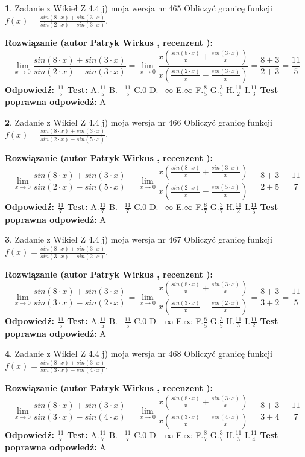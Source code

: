 \documentclass[12pt, a4paper]{article}
\theoremstyle{definition} %
\newtheorem{zad}{}
\newcommand{\zadStart}[1]{\begin{zad}#1\newline}
\newcommand{\zadStop}{\end{zad}}
\newcommand{\rozwStart}[2]{\noindent \textbf{Rozwiązanie (autor #1 , recenzent #2): }\newline}
\newcommand{\rozwStop}{\newline}
\newcommand{\odpStart}{\noindent \textbf{Odpowiedź:}\newline}
\newcommand{\odpStop}{\newline}
\newcommand{\testStart}{\noindent \textbf{Test:}\newline}
\newcommand{\testStop}{\newline}
\newcommand{\kluczStart}{\noindent \textbf{Test poprawna odpowiedź:}\newline}
\newcommand{\kluczStop}{\newline}
\begin{document}
\zadStart{Zadanie z Wikieł Z 4.4 j) moja wersja nr 465}
Obliczyć granicę funkcji $f(x)=\frac{sin(8\cdot x) +sin(3\cdot x)}{sin(2\cdot x) -sin(3\cdot x)}$.
\zadStop
\rozwStart{Patryk Wirkus}{}
$$\lim\limits_{x\to 0}\frac{sin(8\cdot x) +sin(3\cdot x)}{sin(2\cdot x) -sin(3\cdot x)}=\lim\limits_{x\to 0}\frac{x(\frac{sin(8\cdot x)}{x}+\frac{sin(3\cdot x)}{x})}{x(\frac{sin(2\cdot x)}{x}-\frac{sin(3\cdot x)}{x})}=\frac{8+3}{2+3} = \frac{11}{5}$$
\rozwStop
\odpStart
$\frac{11}{5}$
\odpStop
\testStart
A.$\frac{11}{5}$
B.$-\frac{11}{5}$
C.$0$
D.$-\infty$
E.$\infty$
F.$\frac{8}{5}$
G.$\frac{3}{5}$
H.$\frac{11}{2}$
I.$\frac{11}{3}$
\testStop
\kluczStart
A
\kluczStop



\zadStart{Zadanie z Wikieł Z 4.4 j) moja wersja nr 466}
Obliczyć granicę funkcji $f(x)=\frac{sin(8\cdot x) +sin(3\cdot x)}{sin(2\cdot x) -sin(5\cdot x)}$.
\zadStop
\rozwStart{Patryk Wirkus}{}
$$\lim\limits_{x\to 0}\frac{sin(8\cdot x) +sin(3\cdot x)}{sin(2\cdot x) -sin(5\cdot x)}=\lim\limits_{x\to 0}\frac{x(\frac{sin(8\cdot x)}{x}+\frac{sin(3\cdot x)}{x})}{x(\frac{sin(2\cdot x)}{x}-\frac{sin(5\cdot x)}{x})}=\frac{8+3}{2+5} = \frac{11}{7}$$
\rozwStop
\odpStart
$\frac{11}{7}$
\odpStop
\testStart
A.$\frac{11}{7}$
B.$-\frac{11}{7}$
C.$0$
D.$-\infty$
E.$\infty$
F.$\frac{8}{7}$
G.$\frac{3}{7}$
H.$\frac{11}{2}$
I.$\frac{11}{5}$
\testStop
\kluczStart
A
\kluczStop



\zadStart{Zadanie z Wikieł Z 4.4 j) moja wersja nr 467}
Obliczyć granicę funkcji $f(x)=\frac{sin(8\cdot x) +sin(3\cdot x)}{sin(3\cdot x) -sin(2\cdot x)}$.
\zadStop
\rozwStart{Patryk Wirkus}{}
$$\lim\limits_{x\to 0}\frac{sin(8\cdot x) +sin(3\cdot x)}{sin(3\cdot x) -sin(2\cdot x)}=\lim\limits_{x\to 0}\frac{x(\frac{sin(8\cdot x)}{x}+\frac{sin(3\cdot x)}{x})}{x(\frac{sin(3\cdot x)}{x}-\frac{sin(2\cdot x)}{x})}=\frac{8+3}{3+2} = \frac{11}{5}$$
\rozwStop
\odpStart
$\frac{11}{5}$
\odpStop
\testStart
A.$\frac{11}{5}$
B.$-\frac{11}{5}$
C.$0$
D.$-\infty$
E.$\infty$
F.$\frac{8}{5}$
G.$\frac{3}{5}$
H.$\frac{11}{3}$
I.$\frac{11}{2}$
\testStop
\kluczStart
A
\kluczStop



\zadStart{Zadanie z Wikieł Z 4.4 j) moja wersja nr 468}
Obliczyć granicę funkcji $f(x)=\frac{sin(8\cdot x) +sin(3\cdot x)}{sin(3\cdot x) -sin(4\cdot x)}$.
\zadStop
\rozwStart{Patryk Wirkus}{}
$$\lim\limits_{x\to 0}\frac{sin(8\cdot x) +sin(3\cdot x)}{sin(3\cdot x) -sin(4\cdot x)}=\lim\limits_{x\to 0}\frac{x(\frac{sin(8\cdot x)}{x}+\frac{sin(3\cdot x)}{x})}{x(\frac{sin(3\cdot x)}{x}-\frac{sin(4\cdot x)}{x})}=\frac{8+3}{3+4} = \frac{11}{7}$$
\rozwStop
\odpStart
$\frac{11}{7}$
\odpStop
\testStart
A.$\frac{11}{7}$
B.$-\frac{11}{7}$
C.$0$
D.$-\infty$
E.$\infty$
F.$\frac{8}{7}$
G.$\frac{3}{7}$
H.$\frac{11}{3}$
I.$\frac{11}{4}$
\testStop
\kluczStart
A
\kluczStop
\end{document}
